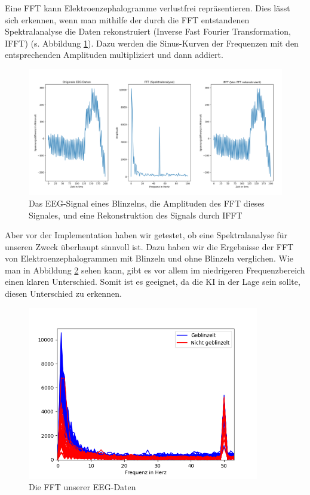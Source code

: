 \documentclass[11pt]{scrartcl}
\begin{document}
	Eine FFT kann Elektroenzephalogramme verlustfrei repräsentieren. Dies lässt sich erkennen, wenn man mithilfe der durch die FFT entstandenen Spektralanalyse die Daten rekonstruiert (Inverse Fast Fourier Transformation, IFFT) (s. Abbildung \ref{EEG-IFFT}). Dazu werden die Sinus-Kurven der Frequenzen mit den entsprechenden Amplituden multipliziert und dann addiert.

	\begin{figure}[h!]
		\includegraphics[width=\textwidth]{pictures/blink_fft_ifft.png}
		\caption{Das EEG-Signal eines Blinzelns, die Amplituden des FFT dieses Signales, und eine Rekonstruktion des Signals durch IFFT}
		\label{EEG-IFFT}
	\end{figure}

	Aber vor der Implementation haben wir getestet, ob eine Spektralanalyse für unseren Zweck überhaupt sinnvoll ist. Dazu haben wir die Ergebnisse der FFT von Elektroenzephalogrammen mit Blinzeln und ohne Blinzeln verglichen. Wie man in Abbildung \ref{EEG-FFT} sehen kann, gibt es vor allem im niedrigeren Frequenzbereich einen klaren Unterschied. %
	Somit ist es geeignet, da die KI in der Lage sein sollte, diesen Unterschied zu erkennen.

	\begin{figure}[H]
		\centering
		\includegraphics[width=0.9\textwidth]{pictures/Die_FFTs_der_EEG-Daten.png}
		\caption{Die FFT unserer EEG-Daten}
		\label{EEG-FFT}
	\end{figure}
	
\end{document}
